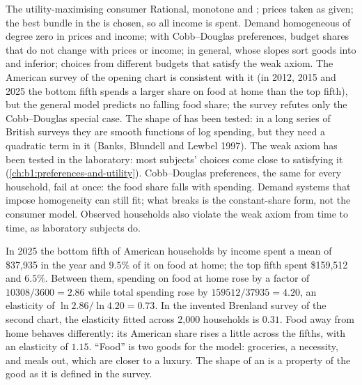 \begin{model}{The utility-maximising consumer}
\assumes Rational, monotone and ; prices taken as given;
the best bundle in the  is chosen, so all income is spent.
\predicts Demand homogeneous of degree zero in prices and income; with
Cobb--Douglas preferences, budget shares that do not change with prices or
income; in general,  whose slopes sort goods into  and
inferior; choices from different budgets that satisfy the weak axiom.
\tested The American survey of the opening chart is consistent with it
(in 2012, 2015 and 2025 the bottom fifth spends a larger share on food at
home than the top fifth), but the general model predicts no falling food
share; the survey refutes only the Cobb--Douglas special case. %
The shape of  has been tested: in a long series of British
surveys they are smooth functions of log spending, but they need a
quadratic term in it (Banks, Blundell and Lewbel 1997). %
The weak axiom has been tested in the laboratory: most subjects' choices
come close to satisfying it (\cref{ch:b1:preferences-and-utility}).
\breaks Cobb--Douglas preferences, the same for every household, fail at
once: the food share falls with spending. Demand systems that impose
homogeneity can still fit; what breaks is the constant-share form, not the
consumer model. Observed households also violate the weak axiom from time
to time, as laboratory subjects do.
\end{model}

\begin{record}
In 2025 the bottom fifth of American households by income spent a mean of
\$37,935 in the year and $9.5\%$ of it on food at home; the top fifth spent
\$159,512 and $6.5\%$. %
Between them, spending on food at home rose by a factor of
$10308/3600 = 2.86$ while total spending rose by $159512/37935 = 4.20$, an
elasticity of $\ln 2.86/\ln 4.20 = 0.73$. %
In the invented Brenland survey of the second chart, the elasticity fitted
across 2,000 households is $0.31$. %
Food away from home behaves differently: its American share rises a little
across the fifths, with an elasticity of $1.15$. %
``Food'' is two goods for the model: groceries, a necessity, and meals out,
which are closer to a luxury. The shape of an  is a property of
the good as it is defined in the survey.
\end{record}

